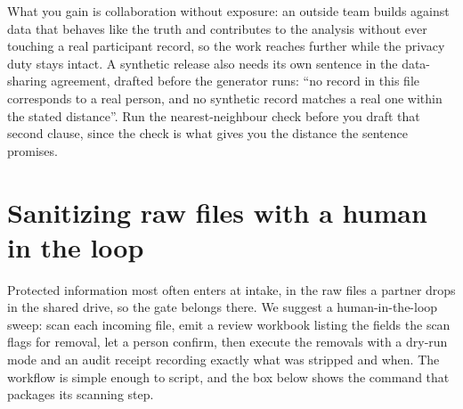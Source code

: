 \documentclass[
    a4paper,
    fontsize=10pt,
    twoside=true,
    numbers=noenddot,
]{kaobook}
\begin{document}
What you gain is collaboration without exposure: an outside team builds against data that behaves like the truth and contributes to the analysis without ever touching a real participant record, so the work reaches further while the privacy duty stays intact.  A synthetic release also needs its own sentence in the data-sharing agreement, drafted before the generator runs: \enquote{no record in this file corresponds to a real person, and no synthetic record matches a real one within the stated distance}. Run the nearest-neighbour check before you draft that second clause, since the check is what gives you the distance the sentence promises.

\section{Sanitizing raw files with a human in the loop}\label{sec:rawsweep}
Protected information most often enters at intake, in the raw files a partner drops in the shared drive, so the gate belongs there. We suggest a human-in-the-loop sweep: scan each incoming file, emit a review workbook listing the fields the scan flags for removal, let a person confirm, then execute the removals with a dry-run mode and an audit receipt recording exactly what was stripped and when. The workflow is simple enough to script, and the box below shows the command that packages its scanning step.
\end{document}

